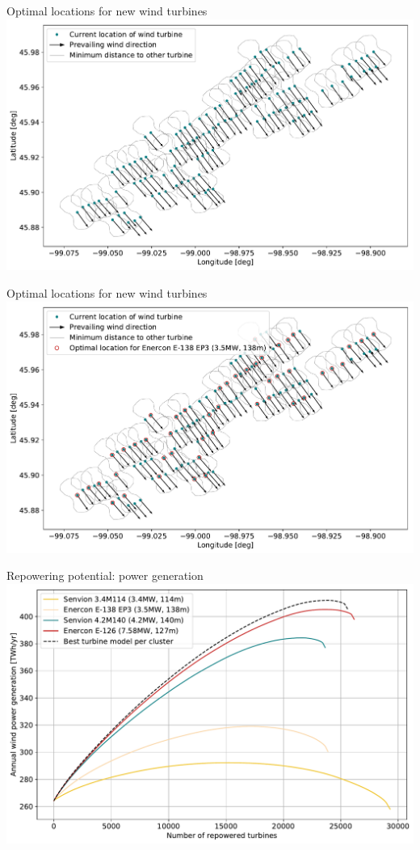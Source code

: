 \documentclass[color=usenames,dvipsnames]{beamer}
\begin{document}
    \begin{frame}{Optimal locations for new wind turbines}
        \includegraphics[width=\textwidth]{../../figures/optimized_cluster-2.pdf}
    \end{frame}

    \begin{frame}{Optimal locations for new wind turbines}
        \includegraphics[width=\textwidth]{../../figures/optimized_cluster-3.pdf}
    \end{frame}

    \begin{frame}{Repowering potential: power generation}
        \includegraphics[width=\textwidth]{../../figures/repower_potential-direction-dependent_power_generation.pdf}
    \end{frame}
\end{document}
